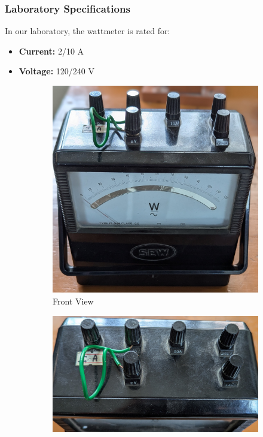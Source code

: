 \documentclass[a4paper,12pt]{article}
\begin{document}
\subsubsection{Laboratory Specifications}
In our laboratory, the wattmeter is rated for:
\begin{itemize}
	\item \textbf{Current:} 2/10 A
	\item \textbf{Voltage:} 120/240 V
\end{itemize}


	\begin{figure}[H]
		\centering
		\begin{subfigure}[t]{0.33\textwidth}
			\centering
			\includegraphics[width=1\linewidth]{Images/18}
			\caption{Front View}
		\end{subfigure}
		\hfill
		\begin{subfigure}[t]{0.33\textwidth}
			\centering
			\includegraphics[width=1\linewidth]{Images/20}

\end{subfigure}
\end{figure}
\end{document}
